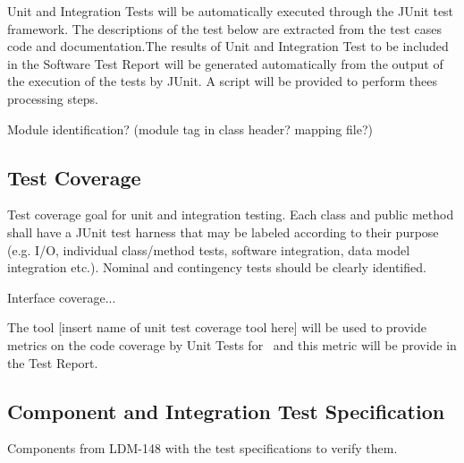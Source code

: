 Unit and Integration Tests will be automatically executed through the JUnit test framework. The descriptions of the test below are extracted from the test cases code and documentation.The results of Unit and Integration Test to be included in the Software Test Report will be generated automatically from the output of the execution of the tests by JUnit. A script will be provided to perform thees processing steps.

Module identification? (module tag in class header? mapping file?)

\subsection{Test Coverage}

Test coverage goal for unit and integration testing. Each class and public method shall have a JUnit test harness that may be labeled according to their purpose (e.g. I/O, individual class/method tests, software integration, data model integration etc.). Nominal and contingency
tests should be clearly identified.

Interface coverage...

The tool [insert name of unit test coverage tool here] will be used to provide metrics on the code coverage by Unit Tests for \product \ and this metric will be provide in the Test Report.

\subsection{Component and Integration Test Specification}

\begin{table}
	\caption{Components from LDM-148 with the test specifications to verify them. \label{tab:testspecs}}
	
\end{table}




